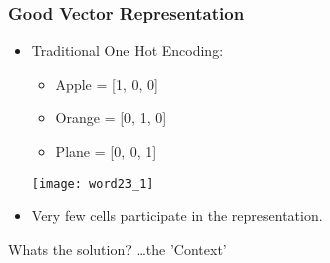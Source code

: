 





\begin{frame}[fragile]\frametitle{Good Vector Representation}
\begin{itemize}
\item Traditional One Hot Encoding:
	\begin{itemize}
	\item Apple = [1, 0, 0]
	\item Orange = [0, 1, 0]
	\item Plane = [0, 0, 1]
	\end{itemize}
\begin{center}
\texttt{[image: word23\_1]}
\end{center}
\item Very few cells participate in the representation.
\end{itemize}

Whats the solution? \ldots the 'Context'
\end{frame}

